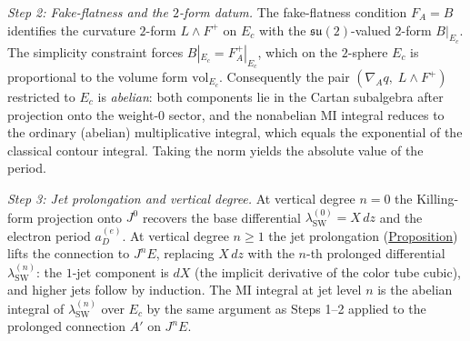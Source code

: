 \begin{proposition}
\emph{Step 2: Fake-flatness and the $2$-form datum.}
The fake-flatness condition $F_A = B$ identifies
the curvature $2$-form $L \wedge F^+$ on $E_c$ with the
$\mathfrak{su}(2)$-valued $2$-form $B|_{E_c}$.  The simplicity constraint
forces $B|_{E_c} = F_A^+|_{E_c}$, which on the $2$-sphere $E_c$ is
proportional to the volume form $\mathrm{vol}_{E_c}$.  Consequently
the pair $(\nabla_A q,\; L \wedge F^+)$ restricted to $E_c$ is
\emph{abelian}: both components lie in the Cartan subalgebra after
projection onto the weight-$0$ sector, and the nonabelian MI integral
reduces to the ordinary (abelian) multiplicative integral, which equals
the exponential of the classical contour integral.  Taking the norm
yields the absolute value of the period.

\emph{Step 3: Jet prolongation and vertical degree.}
At vertical degree $n = 0$ the Killing-form projection onto $J^0$
recovers the base differential $\lambda_{\mathrm{SW}}^{(0)} = X\,dz$
and the electron period $a_D^{(e)}$.  At vertical degree $n \geq 1$ the
jet prolongation (\hyperref[prop:jet-prolongation]{Proposition}) lifts the
connection to $J^n E$, replacing $X\,dz$ with the $n$-th prolonged
differential $\lambda_{\mathrm{SW}}^{(n)}$: the $1$-jet component is
$dX$ (the implicit derivative of the color tube
cubic), and higher jets follow by induction.
The MI integral at jet level $n$ is the abelian integral of
$\lambda_{\mathrm{SW}}^{(n)}$ over $E_c$ by the same argument as
Steps 1--2 applied to the prolonged connection $A'$ on $J^n E$.
\end{proposition}
